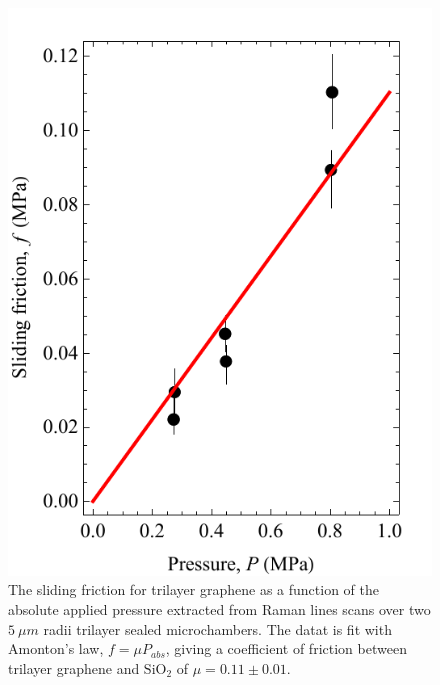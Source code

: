 \begin{figure}
	\begin{center}
	\includegraphics{Figs_Friction/Tri_mu.pdf}
	\end{center}
	\caption[The sliding friction for trilayer graphene as a function of the absolute applied pressure]{\label{fig:fri:trimu} The sliding friction for trilayer graphene as a function of the absolute applied pressure extracted from Raman lines scans over two $5 \ \mu m$ radii trilayer sealed microchambers.
	The datat is fit with Amonton's law, $f=\mu P_{abs}$, giving a coefficient of friction between trilayer graphene and $\mathrm{SiO_2}$ of $\mu=0.11 \pm 0.01$. }
\end{figure}

